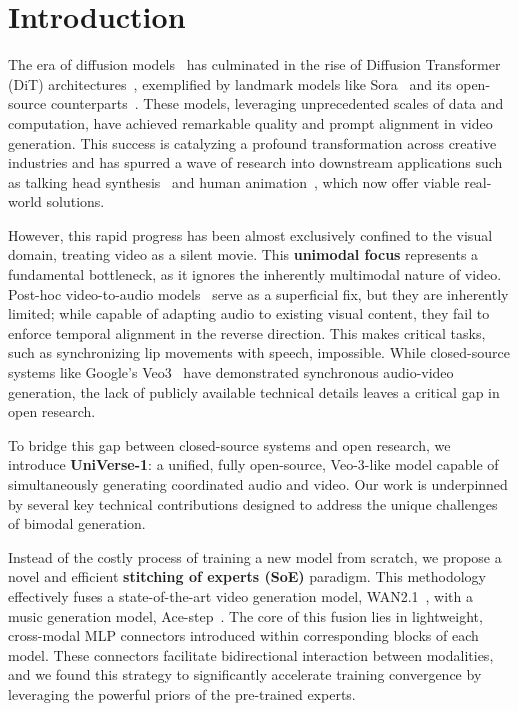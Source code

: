\section{Introduction}

The era of diffusion models~\cite{song2020score, song2020improved, lipman2022flow} has culminated in the rise of Diffusion Transformer (DiT) architectures~\cite{peebles2023scalable}, exemplified by landmark models like Sora~\cite{openaisora2024} and its open-source counterparts~\cite{kong2024hunyuanvideo,yang2024cogvideox,wan2025wan}. These models, leveraging unprecedented scales of data and computation, have achieved remarkable quality and prompt alignment in video generation. This success is catalyzing a profound transformation across creative industries and has spurred a wave of research into downstream applications such as talking head synthesis~\cite{wang2023progressive,yu2023talking,wang2025fantasytalking,luo2025dreamactor} and human animation~\cite{tan2024animate,chen2025hunyuanvideo,lin2025omnihuman}, which now offer viable real-world solutions.

However, this rapid progress has been almost exclusively confined to the visual domain, treating video as a silent movie. This \textbf{unimodal focus} represents a fundamental bottleneck, as it ignores the inherently multimodal nature of video. Post-hoc video-to-audio models~\cite{shan2025hunyuanvideo} serve as a superficial fix, but they are inherently limited; while capable of adapting audio to existing visual content, they fail to enforce temporal alignment in the reverse direction. This makes critical tasks, such as synchronizing lip movements with speech, impossible. While closed-source systems like Google's Veo3~\cite{veo32025} have demonstrated synchronous audio-video generation, the lack of publicly available technical details leaves a critical gap in open research.

To bridge this gap between closed-source systems and open research, we introduce \textbf{UniVerse-1}: a unified, fully open-source, Veo-3-like model capable of simultaneously generating coordinated audio and video. Our work is underpinned by several key technical contributions designed to address the unique challenges of bimodal generation.

Instead of the costly process of training a new model from scratch, we propose a novel and efficient \textbf{stitching of experts (SoE)} paradigm. This methodology effectively fuses a state-of-the-art video generation model, WAN2.1~\cite{wan2025wan}, with a music generation model, Ace-step~\cite{gong2025ace}. The core of this fusion lies in lightweight, cross-modal MLP connectors introduced within corresponding blocks of each model. These connectors facilitate bidirectional interaction between modalities, and we found this strategy to significantly accelerate training convergence by leveraging the powerful priors of the pre-trained experts.


